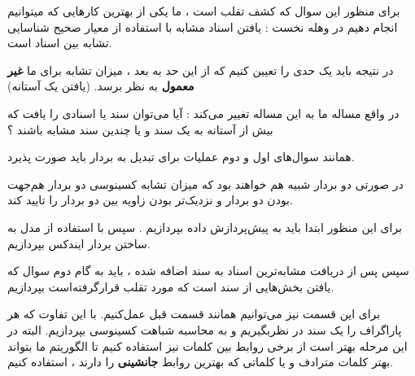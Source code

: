 \begin{boxC}
    برای منظور این سوال که کشف تقلب است ، ما یکی از بهترین کارهایی که میتوانیم انجام دهیم در وهله نخست :
    یافتن اسناد مشابه با استفاده از معیار صحیح شناسایی تشابه بین اسناد است.

    در نتیجه باید یک حدی را تعیین کنیم که از این حد به بعد ، میزان تشابه برای ما 
    \textbf{غیر معمول}
    به نظر برسد.
    (یافتن یک آستانه)

    در واقع مساله ما به این مساله تغییر می‌کند :
    آیا می‌توان سند یا اسنادی را یافت که بیش از آستانه به یک سند و یا چندین سند مشابه باشند ؟

    همانند سوال‌های اول و دوم عملیات 
    برای تبدیل 
    به بردار 
    باید صورت پذیرد.

    در صورتی دو بردار شبیه هم خواهند بود که میزان  
 تشابه کسینوسی دو بردار 
هم‌جهت بودن دو بردار و نزدیک‌تر بودن زاویه بین دو بردار را تایید کند.

برای این منظور ابتدا باید به پیش‌پردازش داده بپردازیم . سپس با استفاده از مدل 
به ساختن بردار ایندکس بپردازیم. 

سپس پس از دریافت مشابه‌ترین اسناد به سند اضافه شده ، باید به گام دوم سوال که یافتن بخش‌هایی از سند است که مورد تقلب قرارگرفته‌است بپردازیم.

برای این قسمت نیز می‌توانیم همانند قسمت قبل عمل‌کنیم. با این تفاوت که هر پاراگراف را یک سند در نظربگیریم و به محاسبه شباهت کسینوسی بپردازیم.
البته در این مرحله بهتر است از برخی روابط بین کلمات نیز استفاده کنیم تا الگوریتم ما بتواند بهتر کلمات مترادف و یا کلماتی که بهترین روابط 
\textbf{جانشینی}
را دارند ، استفاده کنیم.

\end{boxC}